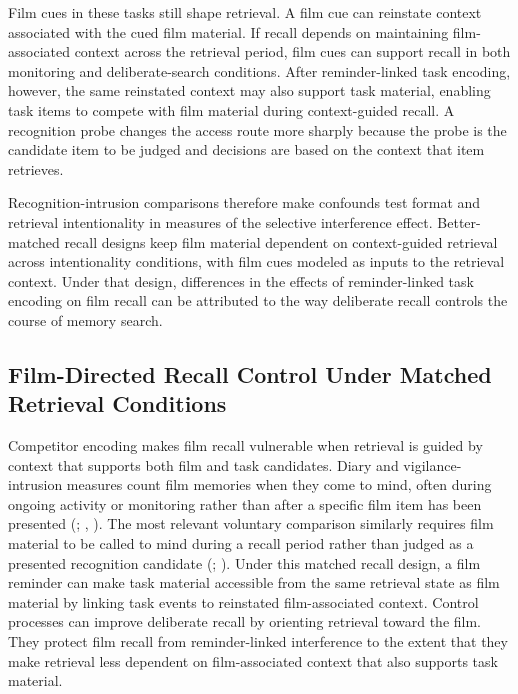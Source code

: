 \documentclass[
  man,
  floatsintext,
  longtable,
  nolmodern,
  notxfonts,
  notimes,
  draftfirst,
  colorlinks=true,linkcolor=blue,citecolor=blue,urlcolor=blue]{apa7}
\begin{document}
Film cues in these tasks still shape retrieval. A film cue can reinstate
context associated with the cued film material. If recall depends on
maintaining film-associated context across the retrieval period, film
cues can support recall in both monitoring and deliberate-search
conditions. After reminder-linked task encoding, however, the same
reinstated context may also support task material, enabling task items
to compete with film material during context-guided recall. A
recognition probe changes the access route more sharply because the
probe is the candidate item to be judged and decisions are based on the
context that item retrieves.

Recognition-intrusion comparisons therefore make confounds test format
and retrieval intentionality in measures of the selective interference
effect. Better-matched recall designs keep film material dependent on
context-guided retrieval across intentionality conditions, with film
cues modeled as inputs to the retrieval context. Under that design,
differences in the effects of reminder-linked task encoding on film
recall can be attributed to the way deliberate recall controls the
course of memory search.

\subsection{Film-Directed Recall Control Under Matched Retrieval
Conditions}\label{film-directed-recall-control-under-matched-retrieval-conditions}

Competitor encoding makes film recall vulnerable when retrieval is
guided by context that supports both film and task candidates. Diary and
vigilance-intrusion measures count film memories when they come to mind,
often during ongoing activity or monitoring rather than after a specific
film item has been presented (; ,
). The most relevant voluntary
comparison similarly requires film material to be called to mind during
a recall period rather than judged as a presented recognition candidate
(;
). Under this
matched recall design, a film reminder can make task material accessible
from the same retrieval state as film material by linking task events to
reinstated film-associated context. Control processes can improve
deliberate recall by orienting retrieval toward the film. They protect
film recall from reminder-linked interference to the extent that they
make retrieval less dependent on film-associated context that also
supports task material.
\end{document}
